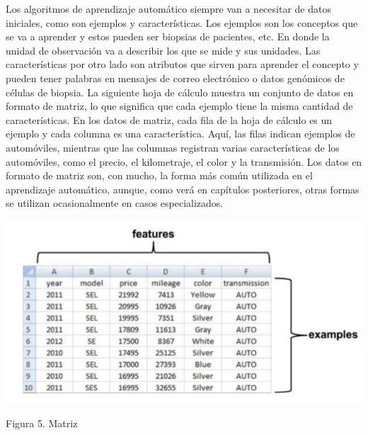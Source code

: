 \documentclass[
  letterpaper,
  DIV=11,
  numbers=noendperiod]{scrartcl}
\begin{document}
Los algoritmos de aprendizaje automático siempre van a necesitar de
datos iniciales, como son ejemplos y características. Los ejemplos son
los conceptos que se va a aprender y estos pueden ser biopsias de
pacientes, etc. En donde la unidad de observación va a describir los que
se mide y sus unidades. Las características por otro lado son atributos
que sirven para aprender el concepto y pueden tener palabras en mensajes
de correo electrónico o datos genómicos de células de biopsia. La
siguiente hoja de cálculo muestra un conjunto de datos en formato de
matriz, lo que significa que cada ejemplo tiene la misma cantidad de
características. En los datos de matriz, cada fila de la hoja de cálculo
es un ejemplo y cada columna es una característica. Aquí, las filas
indican ejemplos de automóviles, mientras que las columnas registran
varias características de los automóviles, como el precio, el
kilometraje, el color y la transmisión. Los datos en formato de matriz
son, con mucho, la forma más común utilizada en el aprendizaje
automático, aunque, como verá en capítulos posteriores, otras formas se
utilizan ocasionalmente en casos especializados.

\begin{Figura 5. Matriz}

{\centering \includegraphics{cap5.png}

}

\caption{Figura 5. Matriz}

\end{Figura 5. Matriz}
\end{document}

